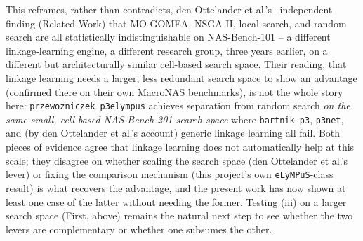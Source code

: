     This reframes, rather than contradicts, den Ottelander et al.'s~\citep{denottelander2021localsearch}
    independent finding (Related Work) that MO-GOMEA, NSGA-II, local search, and random search are all
    statistically indistinguishable on NAS-Bench-101 -- a different linkage-learning engine, a different
    research group, three years earlier, on a different but architecturally similar cell-based search space.
    Their reading, that linkage learning needs a larger, less redundant search space to show an advantage
    (confirmed there on their own MacroNAS benchmarks), is not the whole story here: \texttt{przewozniczek\_p3elympus}
    achieves separation from random search \emph{on the same small, cell-based NAS-Bench-201 search space} where
    \texttt{bartnik\_p3}, \texttt{p3net}, and (by den Ottelander et al.'s account) generic linkage learning all
    fail. Both pieces of evidence agree that linkage learning does not automatically help at this scale; they
    disagree on whether scaling the search space (den Ottelander et al.'s lever) or fixing the comparison
    mechanism (this project's own \texttt{eLyMPuS}-class result) is what recovers the advantage, and the present
    work has now shown at least one case of the latter without needing the former. Testing (iii) on a larger
    search space (First, above) remains the natural next step to see whether the two levers are complementary or
    whether one subsumes the other.
